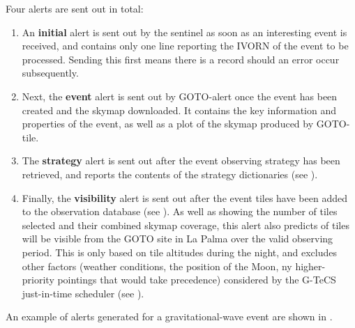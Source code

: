 \begin{colsection}
\begin{colsection}
Four alerts are sent out in total:
%
\begin{enumerate}
    \item An \textbf{initial} alert is sent out by the sentinel as soon as an interesting event is received, and contains only one line reporting the IVORN of the event to be processed. Sending this first means there is a record should an error occur subsequently.
    \item Next, the \textbf{event} alert is sent out by GOTO-alert once the event has been created and the skymap downloaded. It contains the key information and properties of the event, as well as a plot of the skymap produced by GOTO-tile.
    \item The \textbf{strategy} alert is sent out after the event observing strategy has been retrieved, and reports the contents of the strategy dictionaries (see ).
    \item Finally, the \textbf{visibility} alert is sent out after the event tiles have been added to the observation database (see ). As well as showing the number of tiles selected and their combined skymap coverage, this alert also predicts of tiles will be visible from the GOTO site in La Palma over the valid observing period. This is only based on tile altitudes during the night, and excludes other factors (weather conditions, the position of the Moon, ny higher-priority pointings that would take precedence) considered by the G-TeCS just-in-time scheduler (see ).
\end{enumerate}
%
An example of alerts generated for a gravitational-wave event are shown in .


\end{colsection}
\end{colsection}
